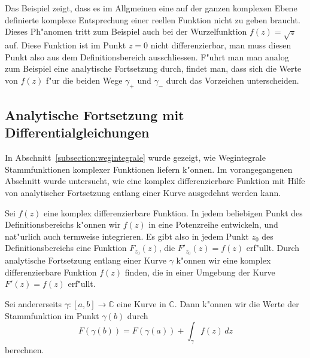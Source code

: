 Das Beispiel zeigt, dass es im Allgmeinen eine auf der ganzen komplexen
Ebene definierte komplexe Entsprechung einer reellen Funktion nicht
zu geben braucht.
Dieses Ph"anomen tritt zum Beispiel auch bei der Wurzelfunktion $f(z)=\sqrt{z}$
auf.
Diese Funktion ist im Punkt $z=0$ nicht differenzierbar, man muss diesen
Punkt also aus dem Definitionsbereich ausschliessen.
F"uhrt man man analog zum Beispiel eine analytische Fortsetzung durch,
findet man, dass sich die Werte von $f(z)$ f"ur die beiden Wege $\gamma_+$
und $\gamma_-$ durch das Vorzeichen unterscheiden.

\subsection{Analytische Fortsetzung mit Differentialgleichungen
\label{komplex:analytische-fortsetzung-dgl}}
In Abschnitt~\ref{subsection:wegintegrale} wurde gezeigt, wie Wegintegrale
Stammfunktionen komplexer Funktionen liefern k"onnen.
Im vorangegangenen Abschnitt wurde untersucht, wie eine komplex differenzierbare
Funktion mit Hilfe von analytischer Fortsetzung entlang einer Kurve
ausgedehnt werden kann.

Sei $f(z)$ eine komplex differenzierbare Funktion.
In jedem beliebigen Punkt des Definitionsbereichs k"onnen wir $f(z)$
in eine Potenzreihe entwickeln, und nat"urlich auch termweise integrieren.
Es gibt also in jedem Punkt $z_0$ des Definitionsbereichs eine
Funktion $F_{z_0}(z)$, die $F'_{z_0}(z)=f(z)$ erf"ullt.
Durch analytische Fortsetzung entlang einer Kurve $\gamma$ k"onnen
wir eine komplex differenzierbare Funktion $f(z)$ finden, die in einer
Umgebung der Kurve $F'(z)=f(z)$ erf"ullt.

Sei andererseits $\gamma\colon[a,b]\to\mathbb C$ eine Kurve in $\mathbb C$.
Dann k"onnen wir die Werte der Stammfunktion im Punkt $\gamma(b)$ durch
\[
F(\gamma(b)) = F(\gamma(a))+\int_\gamma f(z)\,dz
\]
berechnen.

